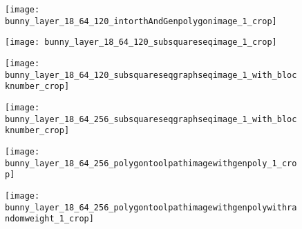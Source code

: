 \begin{figure*}[htp!] 
  \centering
  \begin{subfigure}[t]{2.16in}
    \hspace*{-0.4in}
    \texttt{[image: bunny\_layer\_18\_64\_120\_intorthAndGenpolygonimage\_1\_crop]}
    \caption{\label{fig:singlebunnylayera}}
  \end{subfigure}
  \begin{subfigure}[t]{2.16in}
    \hspace*{-0.1in}
    \texttt{[image: bunny\_layer\_18\_64\_120\_subsquareseqimage\_1\_crop]}
    \caption{\label{fig:singlebunnylayerb}}
  \end{subfigure}
  \begin{subfigure}[t]{2.16in}
    \hspace*{-0.4in}
    \texttt{[image: bunny\_layer\_18\_64\_120\_subsquareseqgraphseqimage\_1\_with\_blocknumber\_crop]}
    \caption{\label{fig:singlebunnylayerc}}
  \end{subfigure}
  \begin{subfigure}[t]{2.16in}
    \hspace*{-0.1in}
    \texttt{[image: bunny\_layer\_18\_64\_256\_subsquareseqgraphseqimage\_1\_with\_blocknumber\_crop]}
    \caption{\label{fig:singlebunnylayerd}}
  \end{subfigure}
  \begin{subfigure}[t]{2.16in}
    \hspace*{-0.4in}
    \texttt{[image: bunny\_layer\_18\_64\_256\_polygontoolpathimagewithgenpoly\_1\_crop]}
    \caption{\label{fig:singlebunnylayere}}
  \end{subfigure}
  \begin{subfigure}[t]{2.16in}
    \hspace*{-0.1in}
    \texttt{[image: bunny\_layer\_18\_64\_256\_polygontoolpathimagewithgenpolywithrandomweight\_1\_crop]}
    \caption{\label{fig:singlebunnylayerf}}
  \end{subfigure}	
  \caption{\label{fig:singlebunnylayer}
    Figure \ref{fig:singlebunnylayera} shows polygon $\mathbb{P}$ and its largest IOP $P$ in blue.
    Figure \ref{fig:singlebunnylayerb} shows decomposition of $P$ with $\delta = 64$.
    Figures \ref{fig:singlebunnylayerc} and \ref{fig:singlebunnylayerd} show dual graphs (red) after implementing Sections \ref{ssec:joincell}, \ref{ssec:enterexitvertexupdate} with $\Delta=120, 256$ (resp.).
    Enter and exit vertices are shown in green and blue dots (also isolated vertices).
    Print paths (red) with uniform and random edge weights are in Figures \ref{fig:singlebunnylayere} and \ref{fig:singlebunnylayerf} (both combined with turn costs).
    } 
\end{figure*}

